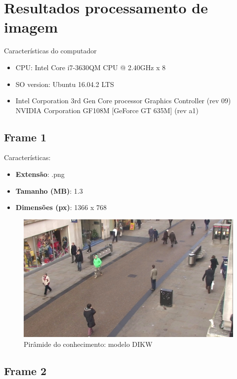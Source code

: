 \chapter{Resultados processamento de imagem }

Características do computador 
\begin{itemize}
	\item CPU: Intel Core i7-3630QM CPU @ 2.40GHz x 8
	\item SO version: Ubuntu 16.04.2 LTS
	\item Intel Corporation 3rd Gen Core processor Graphics Controller (rev 09)
	NVIDIA Corporation GF108M [GeForce GT 635M] (rev a1)
\end{itemize}



\section{Frame 1}


Características: 
\begin{itemize}
	\item \textbf{Extensão}: .png
	\item \textbf{Tamanho (MB)}: 1.3
	\item \textbf{Dimensões (px)}: 1366 x 768
\end{itemize}


\begin{figure}[!htb]
	\centering
	\includegraphics[scale=0.25]{img/vision/frame1.png}
	\caption{Pirâmide do conhecimento: modelo DIKW}
	\label{db}
\end{figure}




\section{Frame 2}

